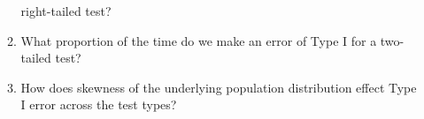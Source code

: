 \documentclass{article}\usepackage[]{graphicx}\usepackage[]{xcolor}
\begin{document}
\begin{enumerate}
\begin{enumerate}
    right-tailed test?
    \item What proportion of the time do we make an error of Type I for a
    two-tailed test?
    \item How does skewness of the underlying population distribution effect
    Type I error across the test types?
  \end{enumerate}
\end{enumerate}

\end{document}
